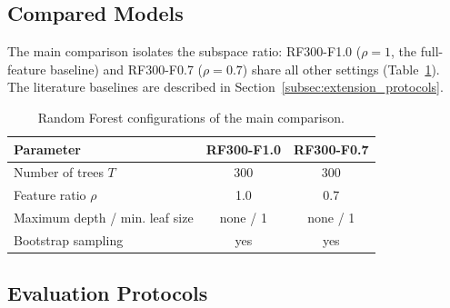 \subsection{Compared Models}
\label{subsec:compared_models}

The main comparison isolates the subspace ratio: RF300-F1.0 ($\rho=1$, the full-feature baseline) and RF300-F0.7 ($\rho=0.7$) share all other settings (Table~\ref{tab:rf_configuration}). The literature baselines are described in Section~\ref{subsec:extension_protocols}.

\begin{table}[!t]
	\centering
	\caption{Random Forest configurations of the main comparison.}
	\label{tab:rf_configuration}
	\footnotesize
	\begin{tabular}{lcc}
		\toprule
		Parameter & RF300-F1.0 & RF300-F0.7 \\
		\midrule
		Number of trees $T$ & 300 & 300 \\
		Feature ratio $\rho$ & 1.0 & 0.7 \\
		Maximum depth / min. leaf size & none / 1 & none / 1 \\
		Bootstrap sampling & yes & yes \\
		\bottomrule
	\end{tabular}
\end{table}

\subsection{Evaluation Protocols}
\label{subsec:evaluation_protocols}


